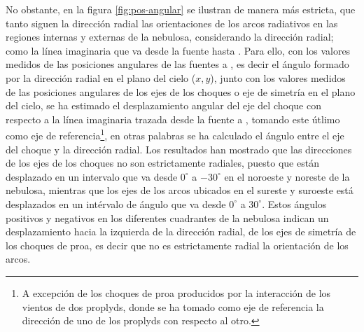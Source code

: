  No obstante, en la figura \ref{fig:pos-angular} se ilustran de manera más estricta, que tanto siguen la dirección radial las orientaciones de los arcos radiativos en las regiones internas y externas  de la nebulosa, considerando la dirección radial; como la línea imaginaria que va desde la fuente hasta \thC{}. Para ello, con los valores medidos de las posiciones angulares de las fuentes a \thC{}, es decir el ángulo formado por la dirección radial en el plano del cielo (\(x, y\)), junto con los valores medidos de las posiciones angulares de los ejes de los choques o eje de simetría en el plano del cielo, se ha estimado el desplazamiento angular del eje del choque con respecto a la línea imaginaria trazada desde la fuente a \thC{}, tomando este útlimo como eje de referencia\footnote{A excepción de los choques de proa producidos por  la interacción de los vientos de dos proplyds, donde se ha tomado como eje de referencia la dirección de uno de los proplyds con respecto al otro.}, en otras palabras se ha calculado el ángulo entre el eje del choque y la dirección radial. Los resultados han mostrado que las direcciones de los ejes de los choques no son estrictamente radiales, puesto que están desplazado en un intervalo  que va desde \(0^{\circ}\) a \(-30^{\circ}\) en el noroeste y noreste de la nebulosa, mientras que los ejes de los arcos ubicados en el sureste y suroeste está desplazados en un intérvalo de ángulo que va desde \(0^{\circ}\) a \(30^{\circ}\). Estos ángulos positivos y negativos en los diferentes cuadrantes de la nebulosa indican un desplazamiento hacia la izquierda de la dirección radial, de los ejes de simetría de los choques de proa, es decir que no es estrictamente radial la orientación de los arcos. \\


